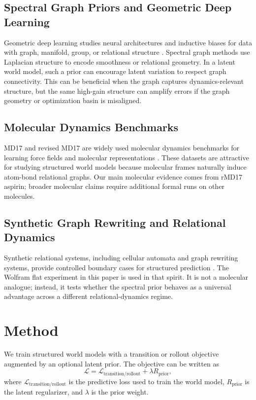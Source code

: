 \documentclass[pdflatex,sn-mathphys-num]{sn-jnl}
\begin{document}
\subsection{Spectral Graph Priors and Geometric Deep Learning}

Geometric deep learning studies neural architectures and inductive biases for data with graph, manifold, group, or relational structure \cite{Bronstein2021GDL}. Spectral graph methods use Laplacian structure to encode smoothness or relational geometry. In a latent world model, such a prior can encourage latent variation to respect graph connectivity. This can be beneficial when the graph captures dynamics-relevant structure, but the same high-gain structure can amplify errors if the graph geometry or optimization basin is misaligned.

\subsection{Molecular Dynamics Benchmarks}

MD17 and revised MD17 are widely used molecular dynamics benchmarks for learning force fields and molecular representations \cite{Chmiela2017MD17,Christensen2020RMD17}. These datasets are attractive for studying structured world models because molecular frames naturally induce atom-bond relational graphs. Our main molecular evidence comes from rMD17 aspirin; broader molecular claims require additional formal runs on other molecules.

\subsection{Synthetic Graph Rewriting and Relational Dynamics}

Synthetic relational systems, including cellular automata and graph rewriting systems, provide controlled boundary cases for structured prediction \cite{Wolfram2020}. The Wolfram flat experiment in this paper is used in that spirit. It is not a molecular analogue; instead, it tests whether the spectral prior behaves as a universal advantage across a different relational-dynamics regime.

\section{Method}

We train structured world models with a transition or rollout objective augmented by an optional latent prior. The objective can be written as
\begin{equation}
    \mathcal{L} = \mathcal{L}_{\mathrm{transition/rollout}} + \lambda R_{\mathrm{prior}},
\end{equation}
where $\mathcal{L}_{\mathrm{transition/rollout}}$ is the predictive loss used to train the world model, $R_{\mathrm{prior}}$ is the latent regularizer, and $\lambda$ is the prior weight.
\end{document}
